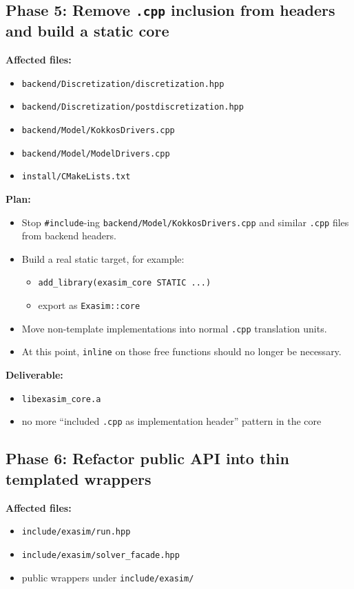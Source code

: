 \documentclass[11pt]{article}
\begin{document}
\subsection*{Phase 5: Remove \texttt{.cpp} inclusion from headers and build a static core}

\textbf{Affected files:}
\begin{itemize}[leftmargin=*]
\item \texttt{backend/Discretization/discretization.hpp}
\item \texttt{backend/Discretization/postdiscretization.hpp}
\item \texttt{backend/Model/KokkosDrivers.cpp}
\item \texttt{backend/Model/ModelDrivers.cpp}
\item \texttt{install/CMakeLists.txt}
\end{itemize}

\textbf{Plan:}
\begin{itemize}[leftmargin=*]
\item Stop \texttt{\#include}-ing \texttt{backend/Model/KokkosDrivers.cpp} and similar \texttt{.cpp} files from backend headers.
\item Build a real static target, for example:
\begin{itemize}[leftmargin=*]
\item \texttt{add\_library(exasim\_core STATIC ...)}
\item export as \texttt{Exasim::core}
\end{itemize}
\item Move non-template implementations into normal \texttt{.cpp} translation units.
\item At this point, \texttt{inline} on those free functions should no longer be necessary.
\end{itemize}

\textbf{Deliverable:}
\begin{itemize}[leftmargin=*]
\item \texttt{libexasim\_core.a}
\item no more ``included \texttt{.cpp} as implementation header'' pattern in the core
\end{itemize}

\subsection*{Phase 6: Refactor public API into thin templated wrappers}

\textbf{Affected files:}
\begin{itemize}[leftmargin=*]
\item \texttt{include/exasim/run.hpp}
\item \texttt{include/exasim/solver\_facade.hpp}
\item public wrappers under \texttt{include/exasim/}
\end{itemize}
\end{document}
